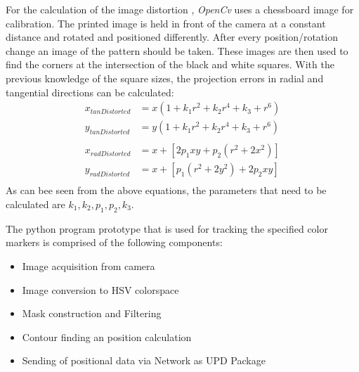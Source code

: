 For the calculation of the image distortion , \textit{OpenCv} uses a chessboard image for calibration. The printed image is held in front of the camera at a constant distance and rotated and positioned differently. After every position/rotation change an image of the pattern should be taken.
These images are then used to find the corners at the intersection of the black and white squares. With the previous knowledge of the square sizes, the projection errors in radial and tangential directions can be calculated:
\begin{equation}
\begin{split}
x_{tanDistorted}&=x(1+k_{1}r^{2}+k_{2}r^{4}+k_{3}+r^{6})\\
y_{tanDistorted}&=y(1+k_{1}r^{2}+k_{2}r^{4}+k_{3}+r^{6})\\
\\
x_{radDistorted}&=x+[2p_{1}xy+p_{2}(r^{2}+2x^{2})]\\
y_{radDistorted}&=x+[p_{1}(r^{2}+2y^{2})+2p_{2}xy]\\
\end{split}
\end{equation} 
As can bee seen from the above equations, the parameters that need to be calculated are $k_{1},k_{2},p_{1},p_{2},k_{3}$.

The python program prototype that is used for tracking the specified color markers is comprised of the following components:
\begin{itemize}
\item Image acquisition from camera
\item Image conversion to HSV colorspace
\item Mask construction and Filtering
\item Contour finding an position calculation
\item Sending of positional data via Network as UPD Package
\end{itemize}

